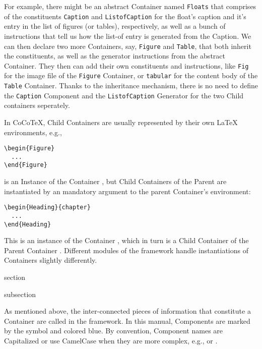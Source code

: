 For example, there might be an abstract Container named
\texttt{Floats} that comprises of the constituents \texttt{Caption}
and \texttt{ListofCaption} for the float's caption and it's entry in
the list of figures (or tables), respectively, as well as a bunch of
instructions that tell us how the list-of entry is generated from the
Caption. We can then declare two more Containers, say, \texttt{Figure}
and \texttt{Table}, that both inherit the constituents, as well as the
generator instructions from the abstract Container. They then can add
their own constituents and instructions, like \texttt{Fig} for the
image file of the \texttt{Figure} Container, or \texttt{tabular} for
the content body of the \texttt{Table} Container. Thanks to the
inheritance mechanism, there is no need to define the \texttt{Caption}
Component and the \texttt{ListofCaption} Generator for the two Child
containers seperately.

In CoCoTeX, Child Containers are usually represented by their own
LaTeX environments, e.g.,
\begin{lstlisting}
\begin{Figure}
  ...
\end{Figure}
\end{lstlisting}
is an Instance of the Container , but Child
Containers of the  Parent are instantiated by
an mandatory argument to the parent Container's environment:
\begin{lstlisting}
\begin{Heading}{chapter}
  ...
\end{Heading}
\end{lstlisting}
This is an instance of the Container , which
in turn is a Child Container of the Parent Container
. Different modules of the {\CoCoTeX}
framework handle instantiations of Containers slightly differently.

\begin{Heading}{section}
\end{Heading}


\begin{Heading}{subsection}
\end{Heading}

As mentioned above, the inter-connected pieces of information that
constitute a Container are called  in
the {\CoCoTeX} framework. In this manual, Components are marked by the
symbol {\ComponentSymbol} and colored blue. By convention, Component
names are Capitalized or use CamelCase when they are more complex,
e.g.,  or .

